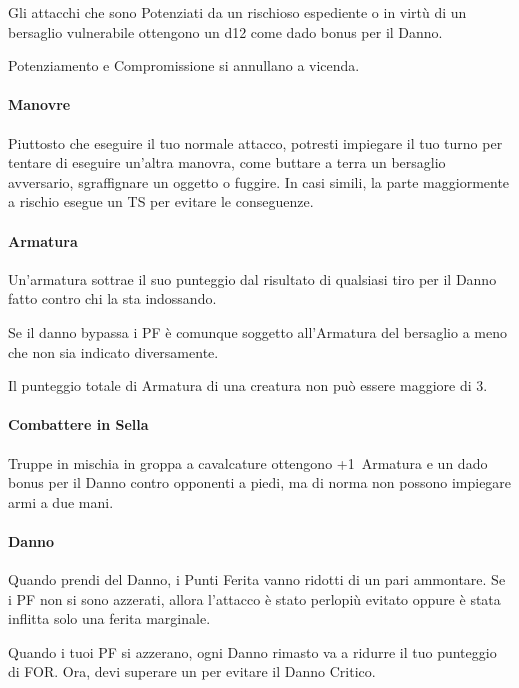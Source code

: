 \documentclass[itdr]{subfiles}
\begin{document}
Gli attacchi che sono Potenziati da un rischioso espediente o in virtù di un bersaglio vulnerabile ottengono un d12 come dado bonus per il Danno.

Potenziamento e Compromissione si annullano a vicenda.

\vfill
\paragraph{Manovre}
Piuttosto che eseguire il tuo normale attacco, potresti impiegare il tuo turno per tentare di eseguire un’altra manovra, come buttare a terra un bersaglio avversario, sgraffignare un oggetto o fuggire. In casi simili, la parte maggiormente a rischio esegue un TS per evitare le conseguenze.

\vfill
\paragraph{Armatura}
Un’armatura sottrae il suo punteggio dal risultato di qualsiasi tiro per il Danno fatto contro chi la sta indossando. 

Se il danno bypassa i PF è comunque soggetto all’Armatura del bersaglio a meno che non sia indicato diversamente. 

Il punteggio totale di Armatura di una creatura non può essere maggiore di 3.

\vfill
\paragraph{Combattere in Sella}

Truppe in mischia in groppa a cavalcature ottengono +1~Armatura e un dado bonus per il Danno contro opponenti a piedi, ma di norma non possono impiegare armi a due mani.

\vfill
\paragraph{Danno}
Quando prendi del Danno, i Punti Ferita vanno ridotti di un pari ammontare. Se i PF non si sono azzerati, allora l’attacco è stato perlopiù evitato oppure è stata inflitta solo una ferita marginale.

Quando i tuoi PF si azzerano, ogni Danno rimasto va a ridurre il tuo punteggio di FOR. Ora, devi superare un  per evitare il Danno Critico.
\end{document}
